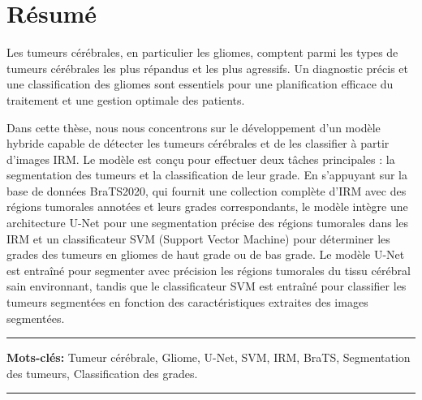 \chapter*{\hfill Résumé \hfill}

Les tumeurs cérébrales, en particulier les gliomes, comptent parmi les types de tumeurs cérébrales les plus répandus et les plus agressifs. Un diagnostic précis et une classification des gliomes sont essentiels pour une planification efficace du traitement et une gestion optimale des patients.

Dans cette thèse, nous nous concentrons sur le développement d'un modèle hybride capable de détecter les tumeurs cérébrales et de les classifier à partir d'images IRM. Le modèle est conçu pour effectuer deux tâches principales : la segmentation des tumeurs et la classification de leur grade. En s'appuyant sur la base de données BraTS2020, qui fournit une collection complète d'IRM avec des régions tumorales annotées et leurs grades correspondants, le modèle intègre une architecture U-Net pour une segmentation précise des régions tumorales dans les IRM et un classificateur SVM (Support Vector Machine) pour déterminer les grades des tumeurs en gliomes de haut grade ou de bas grade. Le modèle U-Net est entraîné pour segmenter avec précision les régions tumorales du tissu cérébral sain environnant, tandis que le classificateur SVM est entraîné pour classifier les tumeurs segmentées en fonction des caractéristiques extraites des images segmentées.

\noindent\rule{\textwidth}{0.2pt}
\textbf{Mots-clés:} Tumeur cérébrale, Gliome, U-Net, SVM, IRM, BraTS, Segmentation des tumeurs, Classification des grades.\\
\noindent\rule{\textwidth}{0.2pt}
